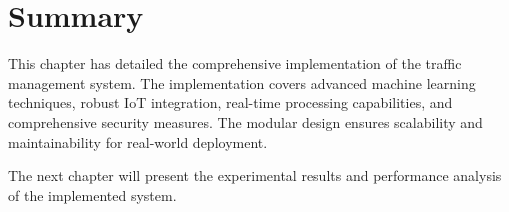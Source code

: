 \section{Summary}

This chapter has detailed the comprehensive implementation of the traffic management system. The implementation covers advanced machine learning techniques, robust IoT integration, real-time processing capabilities, and comprehensive security measures. The modular design ensures scalability and maintainability for real-world deployment.

The next chapter will present the experimental results and performance analysis of the implemented system.
